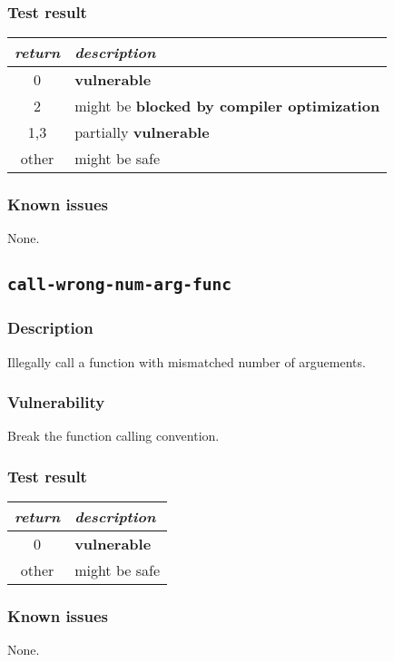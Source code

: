 \documentclass[a4paper]{book}
\begin{document}
\subsubsection{Test result}
\begin{tabular}{cl}
  \toprule
  \emph{return}  & \emph{description} \\
  \midrule
  0              & \textbf{vulnerable} \\
  2              & might be \textbf{blocked by compiler optimization} \\
  1,3            & partially \textbf{vulnerable} \\
  other          & might be safe \\
  \bottomrule
\end{tabular}
  
\subsubsection{Known issues}

None.

\newpage
\subsection{\texttt{call-wrong-num-arg-func}}\label{test-call-wrong-num-arg-func}

\subsubsection{Description}
Illegally call a function with mismatched number of arguements.

\subsubsection{Vulnerability}
Break the function calling convention.

\subsubsection{Test result}
\begin{tabular}{cl}
  \toprule
  \emph{return}  & \emph{description} \\
  \midrule
  0              & \textbf{vulnerable} \\
  other          & might be safe \\
  \bottomrule
\end{tabular}

\subsubsection{Known issues}
None.
\end{document}
